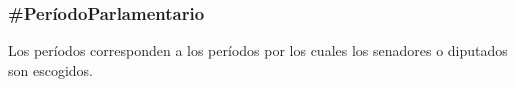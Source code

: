\subsubsection{\#PeríodoParlamentario}

Los períodos corresponden a los períodos por los cuales los senadores
o diputados son escogidos.

\begin{description}
  
\end{description}
